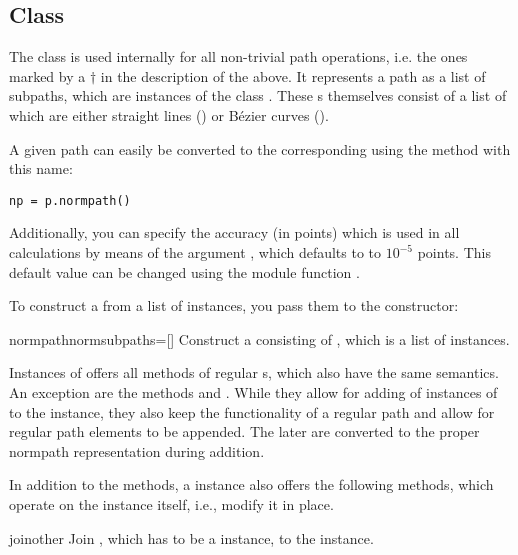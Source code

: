\subsection{Class }

\label{path:normpath}

The  class is used internally for all non-trivial path
operations, i.e. the ones marked by a $\dagger$ in the description of
the  above. It represents a path as a list of subpaths, which are
instances of the class . These s
themselves consist of a list of  which are
either straight lines () or B\'ezier curves
(). 

A given path can easily be converted to the corresponding 
using the method with this name:
\begin{verbatim}
np = p.normpath()
\end{verbatim}
Additionally, you can specify the accuracy (in points) which is used
in all  calculations by means of the argument
, which defaults to to $10^{-5}$ points. This default
value can be changed using the module function . 

To construct a  from a list of 
instances, you pass them to the  constructor:

\begin{classdesc}{normpath}{normsubpaths=[]}
  Construct a  consisting of , which
  is a list of  instances. 
\end{classdesc}

Instances of  offers all methods of regular
s, which also have the same semantics. An exception are
the methods  and . While they allow for
adding of instances of  to the 
instance, they also keep the functionality of a regular path and allow
for regular path elements to be appended. The later are converted to
the proper normpath representation during addition. 

In addition to the  methods, a  instance
also offers the following methods, which operate on the instance
itself, i.e., modify it in place. 

\begin{methoddesc}{join}{other}
  Join , which has to be a  instance, to
  the  instance. 
\end{methoddesc}

